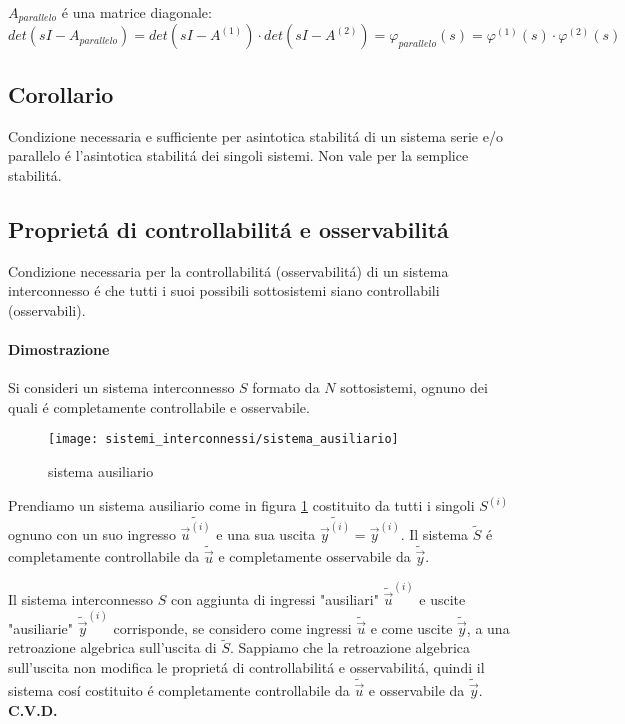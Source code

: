 \documentclass[../main.tex]{subfiles}
\begin{document}
			$ A_{parallelo} $ \'e una matrice diagonale:
			\[
				det(sI-A_{parallelo}) = det(sI-A^{(1)}) \cdot det(sI-A^{(2)}) = \varphi_{parallelo}(s) = \varphi^{(1)}(s) \cdot \varphi^{(2)}(s)
			\]
	\subsection{Corollario}
		Condizione necessaria e sufficiente per asintotica stabilit\'a di un sistema serie e/o parallelo \'e l'asintotica stabilit\'a dei singoli sistemi. Non vale per la semplice stabilit\'a.
		
	\subsection{Propriet\'a di controllabilit\'a e osservabilit\'a}
		Condizione necessaria per la controllabilit\'a (osservabilit\'a) di un sistema interconnesso \'e che tutti i suoi possibili sottosistemi siano controllabili (osservabili).
		\paragraph{Dimostrazione} Si consideri un sistema interconnesso $ S $ formato da $ N $ sottosistemi, ognuno dei quali \'e completamente controllabile e osservabile.
		
		\begin{figure}[H]
			\centering\texttt{[image: sistemi\_interconnessi/sistema\_ausiliario]}
			\caption{sistema ausiliario}
			\label{fig:sistema_ausiliario}
		\end{figure}
		Prendiamo un sistema ausiliario come in figura \ref{fig:sistema_ausiliario} costituito da tutti i singoli $ S^{(i)} $ ognuno con un suo ingresso $ \tilde{\vec u^{(i)}} $ e una sua uscita $ \tilde{\vec y^{(i)}} = \vec{y}^{(i)} $. Il sistema $ \tilde S $ \'e completamente controllabile da $ \tilde{\vec u} $ e completamente osservabile da $ \tilde{\vec y} $.
		
		Il sistema interconnesso $ S $ con aggiunta di ingressi "ausiliari" $ \tilde{\vec u}^{(i)} $ e uscite "ausiliarie" $ \tilde{\vec y}^{(i)} $ corrisponde, se considero come ingressi $ \tilde{\vec u} $ e come uscite $ \tilde{\vec y} $, a una retroazione algebrica sull'uscita di $ \tilde S $. Sappiamo che la retroazione algebrica sull'uscita non modifica le propriet\'a di controllabilit\'a e osservabilit\'a, quindi il sistema cos\'i costituito \'e completamente controllabile da $ \tilde{\vec u} $ e osservabile da $ \tilde{\vec y} $. \textbf{C.V.D.}
		
\end{document}
